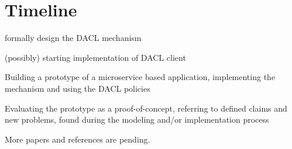 \documentclass[12pt, conference]{IEEEtran}
\begin{document}
%
%

\newpage

\section{Timeline}

\begin{list}{-}{ }
\item formally design the DACL mechanism
\item (possibly) starting implementation of DACL client
\item Building a prototype of a microservice based application, implementing the mechanism and using the DACL policies
\item Evaluating the prototype as a proof-of-concept, referring to defined claims and new problems, found during the modeling and/or implementation process
\end{list}



%






More papers and references are pending. 
\newpage
\onecolumn
\tableofcontents
\end{document}
